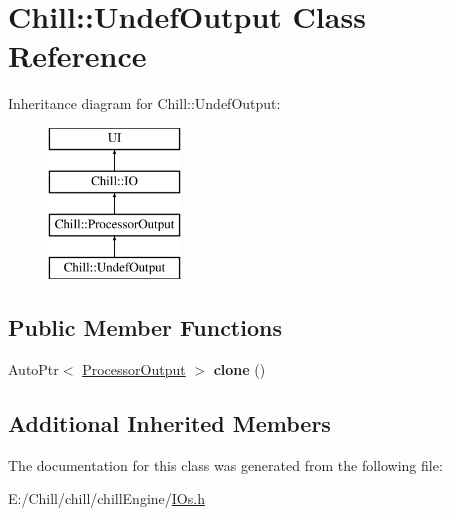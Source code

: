 \hypertarget{class_chill_1_1_undef_output}{}\section{Chill\+:\+:Undef\+Output Class Reference}
\label{class_chill_1_1_undef_output}
Inheritance diagram for Chill\+:\+:Undef\+Output\+:\begin{figure}[H]
\begin{center}
\leavevmode
\includegraphics[height=4.000000cm]{class_chill_1_1_undef_output}
\end{center}
\end{figure}
\subsection*{Public Member Functions}
\begin{DoxyCompactItemize}
\item 
\mbox{\label{class_chill_1_1_undef_output_a1a5d3bf924174e059b50784b4b6b163b}} 
Auto\+Ptr$<$ \mbox{\hyperlink{class_chill_1_1_processor_output}{Processor\+Output}} $>$ {\bfseries clone} ()
\end{DoxyCompactItemize}
\subsection*{Additional Inherited Members}


The documentation for this class was generated from the following file\+:\begin{DoxyCompactItemize}
\item 
E\+:/\+Chill/chill/chill\+Engine/\mbox{\hyperlink{_i_os_8h}{I\+Os.\+h}}\end{DoxyCompactItemize}
